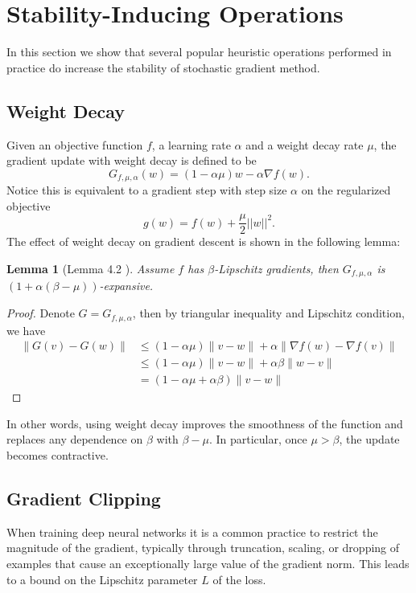 \documentclass{article}[12pt]
\newtheorem{lemma}{Lemma}
\newcommand{\norm}[1]{\left|\left|#1\right|\right|}
\begin{document}
\section{Stability-Inducing Operations} \label{inducing}
In this section we show that several popular heuristic operations performed in practice do increase the stability of stochastic gradient method.

\subsection{Weight Decay}
Given an objective function $f$, a learning rate $\alpha$ and a weight decay rate $\mu$, the gradient update with weight decay is defined to be 
\[
  G_{f, \mu, \alpha}(w) = (1 - \alpha \mu) w - \alpha \nabla f(w).
\] Notice this is equivalent to a gradient step with step size $\alpha$ on the regularized objective
\[
g(w) = f(w) + \frac{\mu}{2} \norm{w}^2.  
\]
The effect of weight decay on gradient descent is shown in the following lemma: 
\begin{lemma}[Lemma 4.2 \cite{trainfaster}]
 Assume $f$ has $\beta$-Lipschitz gradients, then $G_{f, \mu, \alpha}$ is $(1+\alpha(\beta-\mu))$-expansive. 
\end{lemma}
\begin{proof}
   Denote $G = G_{f, \mu, \alpha}$, then by triangular inequality and Lipschitz condition, we have
   \[
   \begin{aligned}\|G(v)-G(w)\| & \leq(1-\alpha \mu)\|v-w\|+\alpha\|\nabla f(w)-\nabla f(v)\| \\ & \leq(1-\alpha \mu)\|v-w\|+\alpha \beta\|w-v\| \\ &=(1-\alpha \mu+\alpha \beta)\|v-w\| \end{aligned}
   \]
\end{proof}
In other words, using weight decay improves the smoothness of the function and replaces any dependence on $\beta$ with $\beta - \mu$. In particular, once $\mu > \beta$, the update becomes contractive. 

\subsection{Gradient Clipping}
When training deep neural networks it is a common practice to restrict the magnitude of the gradient, typically through truncation, scaling, or dropping of examples that cause an exceptionally large value of the gradient norm. This leads to a bound on the Lipschitz parameter $L$ of the loss.
\end{document}
